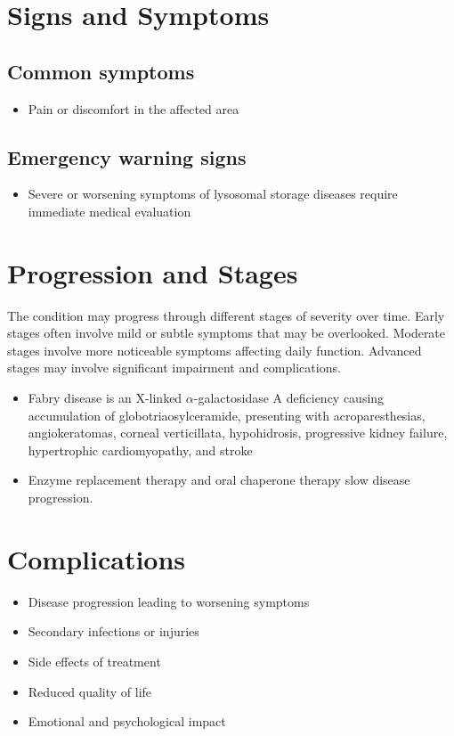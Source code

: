 \section{Signs and Symptoms}

\subsection{Common symptoms}
\begin{itemize}[noitemsep]
  \item Pain or discomfort in the affected area
  \end{itemize}

\subsection{Emergency warning signs}
\begin{itemize}[noitemsep]
  \item Severe or worsening symptoms of lysosomal storage diseases require immediate medical evaluation
\end{itemize}
\section{Progression and Stages}
The condition may progress through different stages of severity over time. Early stages often involve mild or subtle symptoms that may be overlooked. Moderate stages involve more noticeable symptoms affecting daily function. Advanced stages may involve significant impairment and complications.

\begin{itemize}[noitemsep]
  \item Fabry disease is an X-linked $\alpha$-galactosidase A deficiency causing accumulation of globotriaosylceramide, presenting with acroparesthesias, angiokeratomas, corneal verticillata, hypohidrosis, progressive kidney failure, hypertrophic cardiomyopathy, and stroke
  \item Enzyme replacement therapy and oral chaperone therapy slow disease progression.
\end{itemize}
\section{Complications}
\begin{itemize}[noitemsep]
  \item Disease progression leading to worsening symptoms
  \item Secondary infections or injuries
  \item Side effects of treatment
  \item Reduced quality of life
  \item Emotional and psychological impact
\end{itemize}
